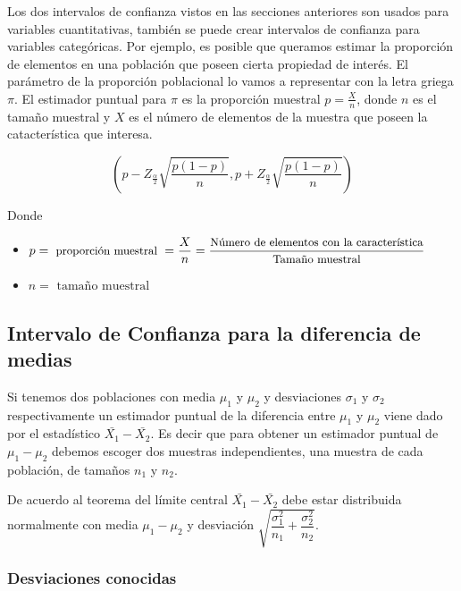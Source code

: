 \documentclass[]{book}
\begin{document}
Los dos intervalos de confianza vistos en las secciones anteriores son
usados para variables cuantitativas, también se puede crear intervalos
de confianza para variables categóricas. Por ejemplo, es posible que
queramos estimar la proporción de elementos en una población que poseen
cierta propiedad de interés. El parámetro de la proporción poblacional
lo vamos a representar con la letra griega \(\pi\). El estimador puntual
para \(\pi\) es la proporción muestral \(p=\frac{X}{n}\), donde \(n\) es
el tamaño muestral y \(X\) es el número de elementos de la muestra que
poseen la catacterística que interesa.

\begin{equation} 
  \left(p - Z_{\frac{\alpha}{2}}\sqrt{\dfrac{p\left(1-p\right)}{n}}, p + Z_{\frac{\alpha}{2}}\sqrt{\dfrac{p\left(1-p\right)}{n}}  \right)
  \label{eq:icprop}
\end{equation}

Donde

\begin{itemize}
\item
  \(\small p=\text{ proporción muestral }= \dfrac{X}{n} = \dfrac{\text{Número de elementos con la característica}}{\text{Tamaño muestral}{}}\)
\item
  \(n= \text{ tamaño muestral}\)
\end{itemize}

\subsection{Intervalo de Confianza para la diferencia de
medias}\label{intervalo-de-confianza-para-la-diferencia-de-medias}

Si tenemos dos poblaciones con media \(\mu_1\) y \(\mu_2\) y
desviaciones \(\sigma_1\) y \(\sigma_2\) respectivamente un estimador
puntual de la diferencia entre \(\mu_1\) y \(\mu_2\) viene dado por el
estadístico \(\bar{X_1}-\bar{X_2}\). Es decir que para obtener un
estimador puntual de \(\mu_1-\mu_2\) debemos escoger dos muestras
independientes, una muestra de cada población, de tamaños \(n_1\) y
\(n_2\).

De acuerdo al teorema del límite central \(\bar{X_1}-\bar{X_2}\) debe
estar distribuida normalmente con media \(\mu_1 - \mu_2\) y desviación
\(\sqrt{\dfrac{\sigma_1^2}{n_1} + \dfrac{\sigma_2^2}{n_2}}\).

\subsubsection{Desviaciones conocidas}\label{desviaciones-conocidas}
\end{document}
